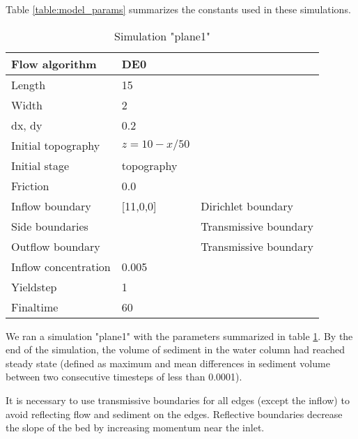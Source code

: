 \documentclass[11pt]{article}
\begin{document}
Table \ref{table:model_params} summarizes the constants used in these simulations.



\begin{table}[]
\centering
\caption{Simulation "plane1"}
\label{table:plane1_params}
\begin{tabular}{|l|l|l|}
\hline
Flow algorithm       & DE0             &                       \\ \hline
Length               & 15              &                       \\ \hline
Width                & 2               &                       \\ \hline
dx, dy               & 0.2             &                       \\ \hline
Initial topography   & $z = 10 - x/50$ &                       \\ \hline
Initial stage        & topography      &                       \\ \hline
Friction             & 0.0             &                       \\ \hline
Inflow boundary      & {[}11,0,0{]}    & Dirichlet boundary    \\ \hline
Side boundaries      &                 & Transmissive boundary   \\ \hline
Outflow boundary     &                 & Transmissive boundary \\ \hline
Inflow concentration & 0.005           &                       \\ \hline
Yieldstep            & 1               &                       \\ \hline
Finaltime            & 60              &                       \\ \hline
\end{tabular}
\end{table}


We ran a simulation "plane1" with the parameters summarized in table \ref{table:plane1_params}. By the end of the simulation, the volume of sediment in the water column had reached steady state (defined as maximum and mean differences in sediment volume between two consecutive timesteps of less than 0.0001).

It is necessary to use transmissive boundaries for all edges (except the inflow) to avoid reflecting flow and sediment on the edges. Reflective boundaries decrease the slope of the bed by increasing momentum near the inlet.
\end{document}
